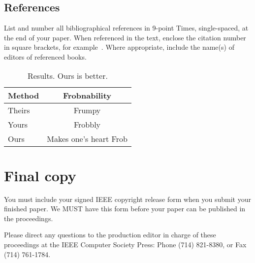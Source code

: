 \documentclass[10pt,twocolumn,letterpaper]{article}
\begin{document}
\subsection{References}

List and number all bibliographical references in 9-point Times,
single-spaced, at the end of your paper. When referenced in the text,
enclose the citation number in square brackets, for
example~\cite{Authors14}.  Where appropriate, include the name(s) of
editors of referenced books.
\begin{table}
\begin{center}
\begin{tabular}{|l|c|}
\hline
Method & Frobnability \\
\hline\hline
Theirs & Frumpy \\
Yours & Frobbly \\
Ours & Makes one's heart Frob\\
\hline
\end{tabular}
\end{center}
\caption{Results.   Ours is better.}
\end{table}


\section{Final copy}

You must include your signed IEEE copyright release form when you submit
your finished paper. We MUST have this form before your paper can be
published in the proceedings.

Please direct any questions to the production editor in charge of these
proceedings at the IEEE Computer Society Press: Phone (714) 821-8380, or
Fax (714) 761-1784.

{\small


}
\end{document}
